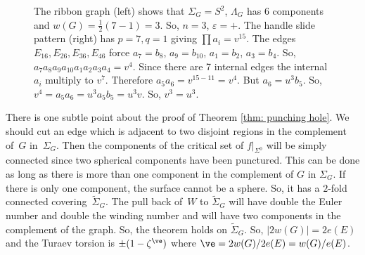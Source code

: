 \begin{figure}[htbp]
\begin{center}
\caption{\smaller The ribbon graph (left) shows that $\Sigma_G=S^2$, $\Lambda_G$ has 6 components and $w(G)=\frac12(7-1)=3$. So, $n=3$, $\varepsilon=+$. The handle slide pattern (right) has $p=7,q=1$ giving $\prod a_i=v^{15}$. The edges $E_{16},E_{26},E_{36},E_{46}$ force $a_7=b_8$, $a_9=b_{10}$, $a_1=b_2$, $a_3=b_4$. So, $a_7a_8a_9a_{10}a_1a_2a_3a_4=v^4$. Since there are 7 internal edges the internal $a_i$ multiply to $v^7$. Therefore $a_5a_6=v^{15-11}=v^4$. But $a_6=u^3b_5$. So, $v^4=a_5a_6=u^3a_5b_5=u^3v$. So, $v^3=u^3$.}
\label{FigureCA2}
\end{center}
\end{figure}

\begin{remark}
There is one subtle point about the proof of Theorem \ref{thm: punching hole}. We should cut an edge which is adjacent to two disjoint regions in the complement of~$G$ in~$\Sigma_G$. Then the components of the critical set of $f|_{\Sigma^0}$ will be simply connected since two spherical components have been punctured. This can be done as long as there is more than one component in the complement of $G$ in $\Sigma_G$. If there is only one component, the surface cannot be a sphere. So, it has a $2$-fold connected covering~$\widetilde \Sigma_G$. The pull back of~$W$ to $\widetilde \Sigma_G$ will have double the Euler number and double the winding number and will have two components in the complement of the graph. So, the theorem holds on $\widetilde\Sigma_G$. So, $|2w(G)|=2e(E)$ and the Turaev torsion is $\pm(1-\zeta^\ve)$ where $\ve=2w(G)/2e(E)=w(G)/e(E)$.
\end{remark}

